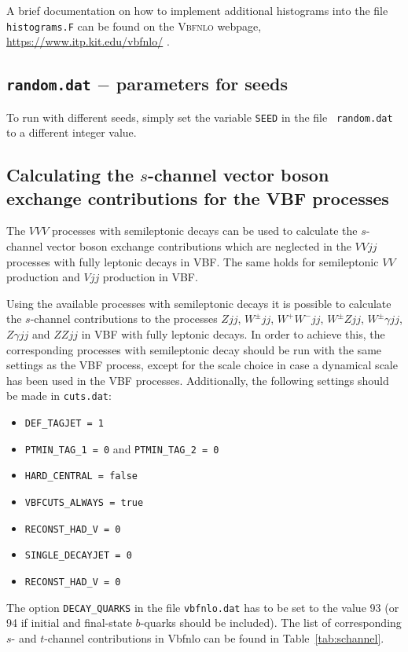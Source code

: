 \documentclass[english,12pt]{article}
\newcommand{\VBFNLO}{\textsc{Vbfnlo}}
\begin{document}
A brief documentation on how to implement additional histograms into the file {\tt histograms.F}
can be found on the \VBFNLO{} webpage,
\url{https://www.itp.kit.edu/vbfnlo/} .




\subsection{{\tt random.dat} $-$ parameters for seeds}
\label{sec:random}
To run with different seeds, simply set the variable {\tt SEED} in the file {\tt
random.dat} to a different integer value.




\subsection[Calculating the $s$-channel contributions for the VBF processes]{Calculating the $s$-channel vector boson exchange contributions for the VBF processes}
\label{sec:schan}
The $VVV$ processes with semileptonic decays can be used to calculate
the $s$-channel vector boson exchange contributions which are neglected in the $VVjj$ processes
with fully leptonic decays in VBF. The same holds for semileptonic $VV$ production and $Vjj$
production in VBF.

Using the available processes with semileptonic decays it is possible to calculate the $s$-channel
contributions to the processes $Zjj$, $W^\pm jj$, $W^+W^-jj$, $W^\pm
Zjj$, $W^\pm\gamma jj$, $Z\gamma jj$
and $ZZjj$ in VBF with fully leptonic decays.
In order to achieve this, the corresponding processes with semileptonic decay should be
run with the same settings as the VBF process, except for the scale choice in case a 
dynamical scale has been used in the VBF processes.
Additionally, the following settings should be made in {\tt cuts.dat}:
\begin{itemize}
 \item {\tt DEF\_TAGJET = 1}
 \item {\tt PTMIN\_TAG\_1 = 0} and {\tt PTMIN\_TAG\_2 = 0}
 \item {\tt HARD\_CENTRAL = false}
 \item {\tt VBFCUTS\_ALWAYS = true}
 \item {\tt RECONST\_HAD\_V = 0}
 \item {\tt SINGLE\_DECAYJET = 0}
 \item {\tt RECONST\_HAD\_V = 0}
\end{itemize}
The option {\tt DECAY\_QUARKS} in the file {\tt vbfnlo.dat} has to be set to the value 93 (or 94
if initial and final-state $b$-quarks should be included).
The list of corresponding $s$- and $t$-channel contributions in {\sc Vbfnlo} can be found in Table~\ref{tab:schannel}.
\end{document}
